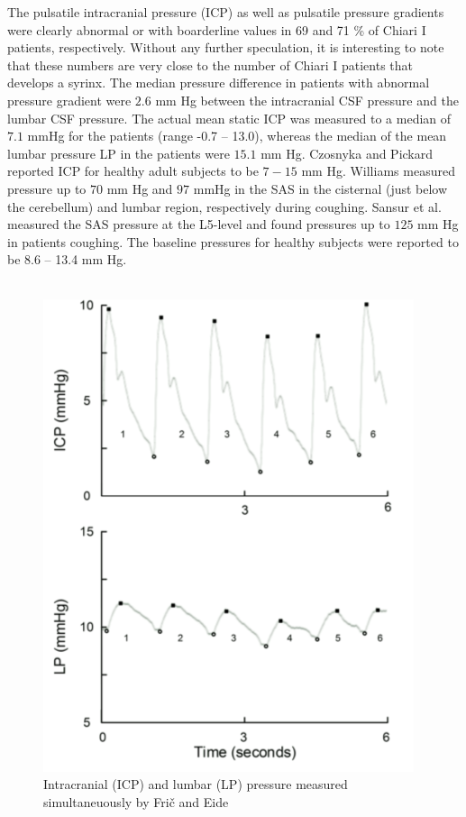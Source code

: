 The pulsatile intracranial pressure (ICP) as well as pulsatile pressure gradients were clearly abnormal or with boarderline values in 69 and 71 \% of Chiari I patients, respectively. Without any further speculation, it is interesting to note that these numbers are very close to the number of Chiari I patients that develops a syrinx. The median pressure difference in patients with abnormal pressure gradient were $2.6$ mm Hg between the intracranial CSF pressure and the lumbar CSF pressure. The actual mean static ICP was measured to a median of $7.1$ mmHg for the patients (range -0.7 -- 13.0), whereas the median of the mean lumbar pressure LP in the patients were $15.1$ mm Hg. Czosnyka and Pickard \cite{Czos04} reported ICP for healthy adult subjects to be $7-15$ mm Hg. Williams \cite{Will76} measured pressure up to $70$ mm Hg and $97$ mmHg in the SAS in the cisternal (just below the cerebellum) and lumbar region, respectively during coughing. Sansur et al. \cite{Sans03} measured the SAS pressure at the L5-level and found pressures up to $125$ mm Hg in patients coughing. The baseline pressures for healthy subjects were reported to be 8.6 -- 13.4 mm Hg.  
\\
\\
\begin{center}
\begin{figure}[!ht]
\includegraphics[scale=0.5]{figures/ICP_and_LP}
\caption{Intracranial (ICP) and lumbar (LP) pressure measured simultaneuously by Fri{\v{c}} and Eide}
\end{figure}
\label{fig:ICP_and_LP}
\end{center}
